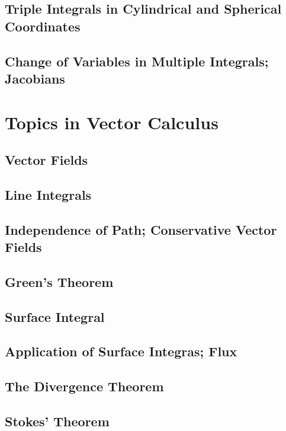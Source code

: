 \documentclass[]{article}
\begin{document}
\subsection{Triple Integrals in Cylindrical and Spherical Coordinates}
\subsection{Change of Variables in Multiple Integrals; Jacobians}
\section{Topics in Vector Calculus}
\subsection{Vector Fields}
\subsection{Line Integrals}
\subsection{Independence of Path; Conservative Vector Fields}
\subsection{Green's Theorem}
\subsection{Surface Integral}
\subsection{Application of Surface Integras; Flux}
\subsection{The Divergence Theorem}
\subsection{Stokes' Theorem}
\end{document}
